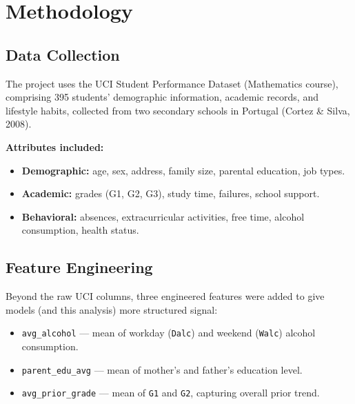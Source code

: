 \documentclass[12pt, a4paper]{article}
\begin{document}
\section{Methodology}

\subsection{Data Collection}
The project uses the UCI Student Performance Dataset (Mathematics course), comprising 395
students' demographic information, academic records, and lifestyle habits, collected from two
secondary schools in Portugal (Cortez \& Silva, 2008).

\textbf{Attributes included:}
\begin{itemize}[noitemsep]
    \item \textbf{Demographic:} age, sex, address, family size, parental education, job types.
    \item \textbf{Academic:} grades (G1, G2, G3), study time, failures, school support.
    \item \textbf{Behavioral:} absences, extracurricular activities, free time, alcohol consumption, health status.
\end{itemize}

\subsection{Feature Engineering}
Beyond the raw UCI columns, three engineered features were added to give models (and this
analysis) more structured signal:
\begin{itemize}[noitemsep]
    \item \texttt{avg\_alcohol} — mean of workday (\texttt{Dalc}) and weekend (\texttt{Walc}) alcohol consumption.
    \item \texttt{parent\_edu\_avg} — mean of mother's and father's education level.
    \item \texttt{avg\_prior\_grade} — mean of \texttt{G1} and \texttt{G2}, capturing overall prior trend.
\end{itemize}
\end{document}
